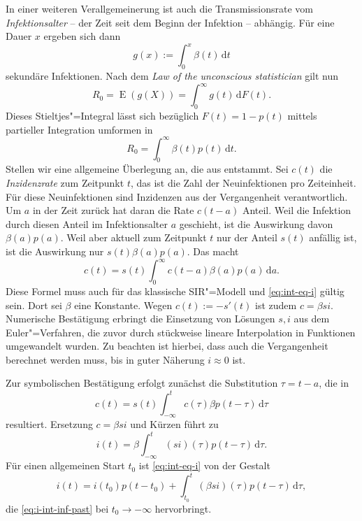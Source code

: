\documentclass[a4paper,10pt,fleqn,twocolumn,twoside,dvipdfmx]{scrartcl}
\numberwithin{equation}{section}
\begin{document}
In einer weiteren Verallgemeinerung ist auch die Transmissionsrate
vom \emph{Infektionsalter} -- der Zeit seit dem Beginn der
Infektion -- abhängig. Für eine Dauer $x$ ergeben sich dann%
\begin{equation}
g(x) := \int_0^x \beta(t)\,\mathrm dt
\end{equation}
sekundäre Infektionen. Nach dem
\emph{Law of the unconscious statistician}
gilt nun%
\begin{equation}
R_0 = \operatorname{E}(g(X)) = \int_0^\infty g(t)\,\mathrm dF(t).
\end{equation}
Dieses Stieltjes"=Integral lässt sich bezüglich $F(t)=1-p(t)$
mittels partieller Integration umformen in%
\begin{equation}\label{eq:R0-from-beta-p}
R_0 = \int_0^\infty \beta(t)p(t)\,\mathrm dt.
\end{equation}
Stellen wir eine allgemeine Überlegung an, die aus \cite{Wallinga}
entstammt. Sei $c(t)$ die
\emph{Inzidenzrate} zum Zeitpunkt $t$, das ist die Zahl der
Neuinfektionen pro Zeiteinheit. Für diese Neuinfektionen sind
Inzidenzen aus der Vergangenheit verantwortlich. Um $a$ in der Zeit
zurück hat daran die Rate $c(t-a)$ Anteil. Weil die
Infektion durch diesen Anteil im Infektionsalter $a$ geschieht, ist
die Auswirkung davon $\beta(a)p(a)$. Weil aber aktuell zum Zeitpunkt
$t$ nur der Anteil $s(t)$ anfällig ist, ist die Auswirkung nur
$s(t)\beta(a)p(a)$. Das macht
\begin{equation}\label{eq:c-integral-equation}
c(t) = s(t)\int_0^\infty c(t-a)\beta(a)p(a)\,\mathrm da.
\end{equation}
Diese Formel muss auch für das klassische SIR"=Modell und
\eqref{eq:int-eq-i} gültig sein. Dort sei $\beta$ eine Konstante.
Wegen $c(t):=-s'(t)$ ist zudem $c=\beta si$. Numerische
Bestätigung erbringt die Einsetzung von Lösungen $s,i$
aus dem Euler"=Verfahren, die zuvor durch stückweise lineare
Interpolation in Funktionen umgewandelt wurden. Zu beachten ist
hierbei, dass auch die Vergangenheit berechnet werden muss, bis in
guter Näherung $i\approx 0$ ist.

Zur symbolischen Bestätigung erfolgt zunächst die Substitution
$\tau=t-a$, die in%
\begin{equation}
c(t) = s(t)\int_{-\infty}^t c(\tau)\beta p(t-\tau)\,\mathrm d\tau
\end{equation}
resultiert. Ersetzung $c=\beta si$ und Kürzen führt zu%
\begin{equation}\label{eq:i-int-inf-past}
i(t) = \beta\int_{-\infty}^t (si)(\tau) p(t-\tau)\,\mathrm d\tau.
\end{equation}
Für einen allgemeinen Start $t_0$ ist \eqref{eq:int-eq-i}
von der Gestalt%
\begin{equation}
i(t) = i(t_0)p(t-t_0)+\int_{t_0}^t (\beta si)(\tau)p(t-\tau)\,\mathrm d\tau,
\end{equation}
die \eqref{eq:i-int-inf-past} bei $t_0\to -\infty$ hervorbringt.
\end{document}

